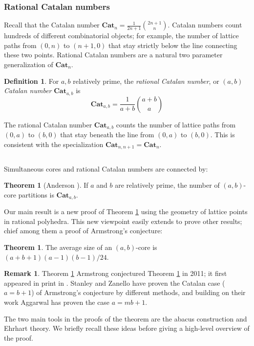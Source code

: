 \documentclass{amsart}[12pt]
\theoremstyle{definition}
\newtheorem{theorem}[dummy]{Theorem}
\newtheorem{definition}[dummy]{Definition}
\newtheorem{remark}[dummy]{Remark}
\newcommand{\Cat}{\mathbf{Cat}}
\begin{document}
\subsubsection{Rational Catalan numbers}
Recall that the Catalan number $\Cat_n=\frac{1}{2n+1}\binom{2n+1}{n}$. Catalan numbers count hundreds of different combinatorial objects; for example, the number of lattice paths from $(0,n)$ to $(n+1,0)$ that stay strictly below the line connecting these two points.
Rational Catalan numbers are a natural two parameter generalization of $\Cat_n$.
\begin{definition}
For $a,b$ relatively prime, the \emph{rational Catalan number}, or \emph{$(a,b)$ Catalan number} $\Cat_{a,b}$ is
$$\Cat_{a,b}=\frac{1}{a+b}\binom{a+b}{a}$$
\end{definition}
The rational Catalan number $\Cat_{a,b}$ counts the number of lattice paths from $(0,a)$ to $(b,0)$ that stay beneath the line from $(0,a)$ to $(b,0)$. This is consistent with the specialization $\Cat_{n,n+1}=\Cat_n$.
\subsection{}
Simultaneous cores and rational Catalan numbers are connected by:
\begin{theorem}[Anderson \cite{anderson}] \label{thm:anderson}
If $a$ and $b$ are relatively prime, the number of
$(a,b)$-core partitions is $\Cat_{a,b}$.
\end{theorem}
Our main result is a new proof of Theorem \ref{thm:anderson} using the geometry of lattice points in rational polyhedra. This new viewpoint easily extends to prove other results; chief among them a proof of Armstrong's conjecture:
\begin{theorem} \label{thm:armstrong}
The average size of an $(a,b)$-core is $(a+b+1)(a-1)(b-1)/24$.
\end{theorem}
\begin{remark}
Theorem \ref{thm:armstrong} Armstrong conjectured Theorem \ref{thm:armstrong} in 2011; it first appeared in print in \cite{AHJ}.
Stanley and Zanello \cite{SZ} have proven the Catalan case ($a=b+1$) of Armstrong's conjecture by different methods, and building on their work Aggarwal \cite{Aggarwal} has proven the case $a=mb+1$.
\end{remark}
The two main tools in the proofs of the theorem are the abacus construction and Ehrhart theory. We briefly recall these ideas before giving a high-level overview of the proof.
\end{document}
